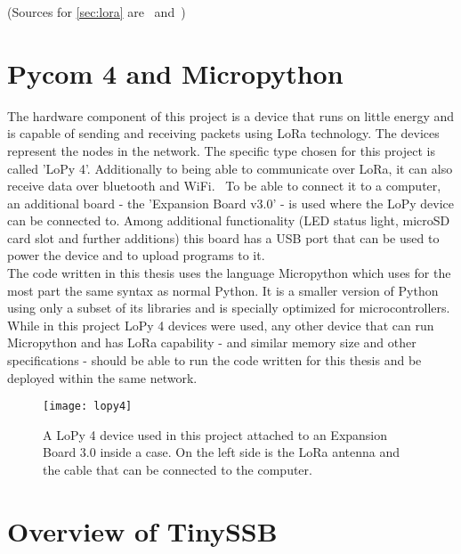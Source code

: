 (Sources for \cref{sec:lora} are~\cite{10.1007/978-3-030-01168-0_11} and~\cite{10.1145/3293534})

\section{Pycom 4 and Micropython}
The hardware component of this project is a device that runs on little energy and is capable of sending and receiving packets using LoRa technology. The devices represent the nodes in the network. The specific type chosen for this project is called 'LoPy 4'. Additionally to being able to communicate over LoRa, it can also receive data over bluetooth and WiFi.~\cite{LoPy} To be able to connect it to a computer, an additional board - the 'Expansion Board v3.0' - is used where the LoPy device can be connected to. Among additional functionality (LED status light, microSD card slot and further additions) this board has a USB port that can be used to power the device and to upload programs to it.~\cite{ExpansionBoard} \\
The code written in this thesis uses the language Micropython which uses for the most part the same syntax as normal Python. It is a smaller version of Python using only a subset of its libraries and is specially optimized for microcontrollers. \cite{Micropython} \\
While in this project LoPy 4 devices were used, any other device that can run Micropython and has LoRa capability - and similar memory size and other specifications - should be able to run the code written for this thesis and be deployed within the same network.
\begin{figure}
\centering
\texttt{[image: lopy4]}
\caption{A LoPy 4 device used in this project attached to an Expansion Board 3.0 inside a case. On the left side is the LoRa antenna and the cable that can be connected to the computer.}
\label{fig:lopy4}
\end{figure}

\newpage

\section{Overview of TinySSB}
\label{sec:tiny}
